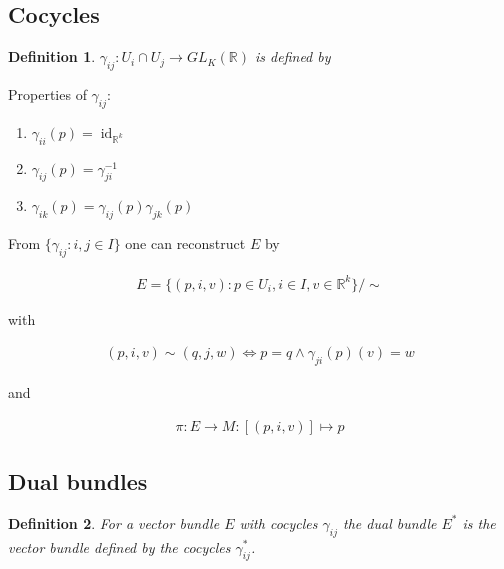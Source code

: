 \documentclass{scrartcl}
\newcommand{\R}{\mathbb R}
\newtheorem*{mydef}{Definition}
\begin{document}
\subsection{Cocycles}

\begin{mydef}
  $\gamma_{ij}:U_i\cap U_j\rightarrow GL_K(\R)$ is defined by

\end{mydef}

Properties of $\gamma_{ij}$:

\begin{enumerate}
\item $\gamma_{ii}(p) = \operatorname{id}_{\R^k}$
\item $\gamma_{ij}(p) = \gamma_{ji}^{-1}$
\item $\gamma_{ik}(p) = \gamma_{ij}(p) \gamma_{jk}(p)$
\end{enumerate}

From $\{\gamma_{ij}:i,j\in I\}$ one can reconstruct $E$ by

\begin{align}
  E = \{ (p,i,v) : p\in U_i, i\in I, v\in \R^k\}/{\sim}
\end{align}

with

\begin{align}
  (p,i,v) \sim (q,j,w) \Leftrightarrow p = q \land \gamma_{ji}(p)(v) = w
\end{align}

and

\begin{align}
  \pi: E\rightarrow M : [(p,i,v)] \mapsto p
\end{align}

\subsection{Dual bundles}

\begin{mydef}
  For a vector bundle $E$ with cocycles $\gamma_{ij}$ the \emph{dual bundle} $E^*$ is the vector bundle defined by the cocycles $\gamma_{ij}^*$.
\end{mydef}
\end{document}
